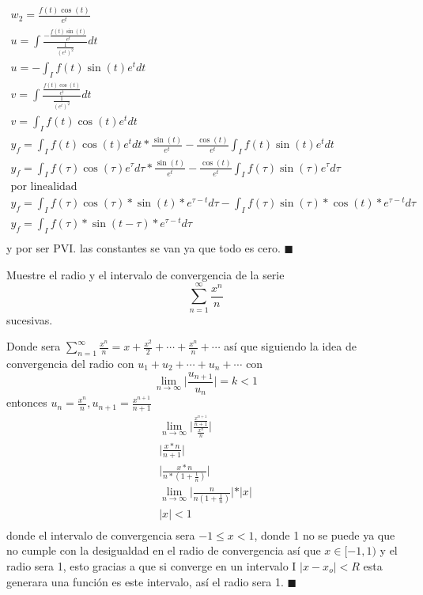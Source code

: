 \begin{mdframed}
\begin{gather*}
        w_2 = \frac{f(t)\cos(t)}{e^t}\\
        u = \int{\frac{-\frac{f(t)\sin(t)}{e^t}}{\frac{1}{(e^t)^2}}dt}\\
        u = -\int_I f(t)\sin(t)e^t dt\\
        v = \int{\frac{\frac{f(t)\cos(t)}{e^t}}{\frac{1}{(e^t)^2}}dt}\\
        v = \int_I f(t)\cos(t)e^t dt\\
        y_f =  \int_I f(t)\cos(t)e^t dt*\frac{\sin(t)}{e^t} -\frac{\cos(t)}{e^t}\int_I f(t)\sin(t)e^t dt\\
        y_f =  \int_I f(\tau)\cos(\tau)e^\tau d\tau*\frac{\sin(t)}{e^t} -\frac{\cos(t)}{e^t}\int_I f(\tau)\sin(\tau)e^\tau d\tau\\
        \text{por linealidad}\\
        y_f =  \int_I f(\tau)\cos(\tau)*\sin(t)*e^{\tau-t} d\tau -\int_I f(\tau)\sin(\tau)*\cos(t)*e^{\tau-t} d\tau\\
        y_f =  \int_I f(\tau)*\sin(t-\tau)*e^{\tau-t} d\tau \\
    \end{gather*}
    y por ser PVI. las constantes se van ya que todo es cero. $\blacksquare$
\end{mdframed}
\begin{prob}
    Muestre el radio y el intervalo de convergencia de la serie $$\sum_{n=1}^\infty \frac{x^n}{n}$$
sucesivas.
\end{prob}
\begin{mdframed}
    Donde sera $\sum_{n=1}^\infty \frac{x^n}{n}= x+\frac{x^2}{2}+\cdots +\frac{x^n}{n}+\cdots$ así que siguiendo la idea de convergencia del radio con $u_1+u_2+\cdots+u_n+\cdots$ con $$\lim_{n\longrightarrow \infty} \vert \frac{u_{n+1}}{u_{n}}\vert = k < 1$$ entonces $u_n= \frac{x^n}{n}, u_{n+1}= \frac{x^{n+1}}{n+1}$
    \begin{gather*}
        \lim_{n\longrightarrow \infty} \vert \frac{\frac{x^{n+1}}{n+1}}{\frac{x^{n}}{n}}\vert\\
        \vert \frac{x*n}{n+1}\vert\\    
        \vert \frac{x*n}{n*(1+\frac{1}{n})}\vert\\  
          \lim_{n\longrightarrow \infty}\vert \frac{n}{n(1+\frac{1}{n})}\vert *\vert x\vert\\
        \vert x \vert < 1\\
    \end{gather*}
    donde el intervalo de convergencia sera $-1 \leq x <1$, donde 1 no se puede ya que no cumple con la desigualdad en el radio de convergencia así que $x \in [-1,1)$ y el radio sera 1, esto gracias a que si converge en un intervalo I $\vert x-x_o\vert < R$ esta generara una función es este intervalo, así el radio sera 1. $\blacksquare$
\end{mdframed}

